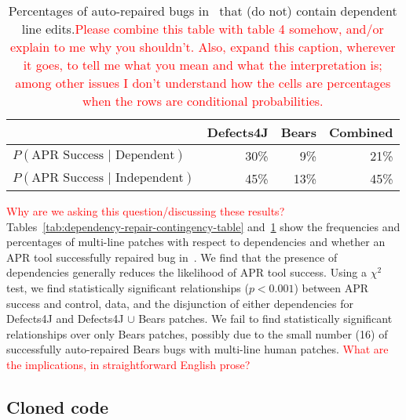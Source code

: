 \documentclass[sigconf, timestamp-false, anonymous=true]{acmart}
\newcommand\todo[1]{\textcolor{red}{#1}}
\begin{document}
\begin{table}
{\begin{center}
	\begin{tabular}{l | rrr}
            	\toprule
		& Defects4J & Bears & Combined \\
		\midrule
		$P(\mbox{APR Success } | \mbox{ Dependent})$ & 30\% & 9\% & 21\% \\
		$P(\mbox{APR Success } | \mbox{ Independent})$ & 45\% & 13\% & 45\% \\
		\bottomrule
	\end{tabular}
 \end{center}
}
	\caption{Percentages of auto-repaired bugs in~\cite{durieux-repair-them-all} 
	that (do not) contain dependent line edits.\todo{Please combine this
          table with table 4 somehow, and/or explain to me why you shouldn't.
          Also, expand this caption, wherever it goes, to tell me what you mean
          and what the interpretation is; among other issues I don't understand how the cells are
          percentages when the rows are conditional probabilities.}
	\label{tab:dependency-repair-percents}}
\end{table}

\todo{Why are we asking this question/discussing these results?} 
Tables~\ref{tab:dependency-repair-contingency-table} and~\ref{tab:dependency-repair-percents}
show the frequencies and percentages of multi-line patches with respect to dependencies 
and whether an APR tool successfully repaired bug in~\cite{durieux-repair-them-all}.
We find that the presence of dependencies generally reduces the likelihood of APR tool success.
Using a $\chi^2$ test, we find statistically significant relationships ($p < 0.001$)
between APR success and control, data, and the disjunction of either dependencies 
for Defects4J and Defects4J $\cup$ Bears patches. We fail to find statistically 
significant relationships over only Bears patches, possibly due to the small number (16) of 
successfully auto-repaired Bears bugs with multi-line human patches.
\todo{What are the implications, in straightforward English prose?}


\subsection{Cloned code}

\end{document}
